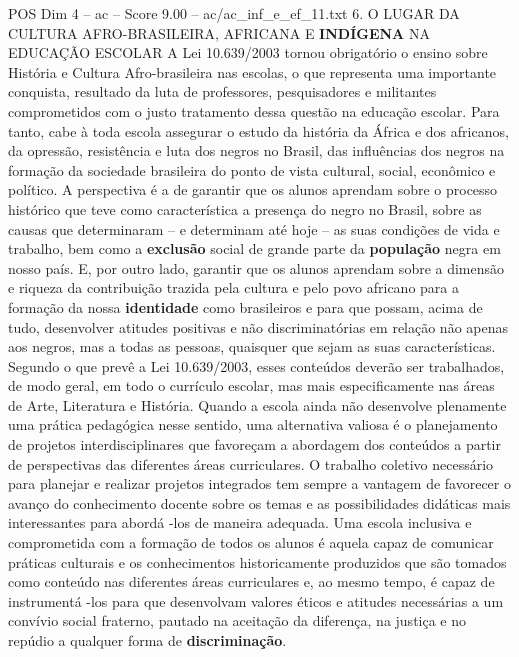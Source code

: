 \begin{textsample}{POS Dim 4 – ac – Score 9.00 – ac/ac\_inf\_e\_ef\_11.txt}  \label{ex:f4_pos_242}
6.
O LUGAR DA CULTURA AFRO-BRASILEIRA, AFRICANA E \textbf{INDÍGENA} NA EDUCAÇÃO ESCOLAR A Lei 10.639/2003 tornou obrigatório o ensino sobre História e Cultura Afro-brasileira nas escolas, o que representa uma importante conquista, resultado da luta de professores, pesquisadores e militantes comprometidos com o justo tratamento dessa questão na educação escolar.
Para tanto, cabe à toda escola assegurar o estudo da história da África e dos africanos, da opressão, resistência e luta dos negros no Brasil, das influências dos negros na formação da sociedade brasileira do ponto de vista cultural, social, econômico e político.
A perspectiva é a de garantir que os alunos aprendam sobre o processo histórico que teve como característica a presença do negro no Brasil, sobre as causas que determinaram – e determinam até hoje – as suas condições de vida e trabalho, bem como a \textbf{exclusão} social de grande parte da \textbf{população} negra em nosso país.
E, por outro lado, garantir que os alunos aprendam sobre a dimensão e riqueza da contribuição trazida pela cultura e pelo povo africano para a formação da nossa \textbf{identidade} como brasileiros e para que possam, acima de tudo, desenvolver atitudes positivas e não discriminatórias em relação não apenas aos negros, mas a todas as pessoas, quaisquer que sejam as suas características.
Segundo o que prevê a Lei 10.639/2003, esses conteúdos deverão ser trabalhados, de modo geral, em todo o currículo escolar, mas mais especificamente nas áreas de Arte, Literatura e História.
Quando a escola ainda não desenvolve plenamente uma prática pedagógica nesse sentido, uma alternativa valiosa é o planejamento de projetos interdisciplinares que favoreçam a abordagem dos conteúdos a partir de perspectivas das diferentes áreas curriculares.
O trabalho coletivo necessário para planejar e realizar projetos integrados tem sempre a vantagem de favorecer o avanço do conhecimento docente sobre os temas e as possibilidades didáticas mais interessantes para abordá -los de maneira adequada.
Uma escola inclusiva e comprometida com a formação de todos os alunos é aquela capaz de comunicar práticas culturais e os conhecimentos historicamente produzidos que são tomados como conteúdo nas diferentes áreas curriculares e, ao mesmo tempo, é capaz de instrumentá -los para que desenvolvam valores éticos e atitudes necessárias a um convívio social fraterno, pautado na aceitação da diferença, na justiça e no repúdio a qualquer forma de \textbf{discriminação}.

\end{textsample}
